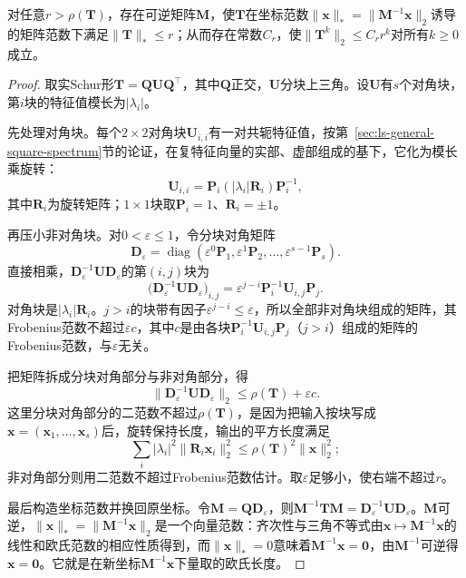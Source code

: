 \begin{lemma}[矩阵幂的几何上界]
\label{lem:ls-power-geometric-bound}
对任意$r>\rho(\bm T)$，存在可逆矩阵$\bm M$，使$\bm T$在坐标范数$\lVert\bm x\rVert_*=\lVert\bm M^{-1}\bm x\rVert_2$诱导的矩阵范数下满足$\lVert\bm T\rVert_*\leq r$；从而存在常数$C_r$，使$\lVert\bm T^k\rVert_2\leq C_rr^k$对所有$k\geq0$成立。
\end{lemma}
\begin{proof}
取实Schur形$\bm T=\bm Q\bm U\bm Q^\top$，其中$\bm Q$正交，$\bm U$分块上三角。设$\bm U$有$s$个对角块，第$i$块的特征值模长为$|\lambda_i|$。

先处理对角块。每个$2\times2$对角块$\bm U_{i,i}$有一对共轭特征值，按第~\ref{sec:ls-general-square-spectrum}节的论证，在复特征向量的实部、虚部组成的基下，它化为模长乘旋转：
\[
 \bm U_{i,i}=\bm P_i(|\lambda_i|\bm R_i)\bm P_i^{-1},
\]
其中$\bm R_i$为旋转矩阵；$1\times1$块取$\bm P_i=1$、$\bm R_i=\pm1$。

再压小非对角块。对$0<\varepsilon\leq1$，令分块对角矩阵
\[
 \bm D_\varepsilon=\operatorname{diag}(\varepsilon^{0}\bm P_1,\varepsilon^{1}\bm P_2,\ldots,\varepsilon^{s-1}\bm P_s).
\]
直接相乘，$\bm D_\varepsilon^{-1}\bm U\bm D_\varepsilon$的第$(i,j)$块为
\[
 \bigl(\bm D_\varepsilon^{-1}\bm U\bm D_\varepsilon\bigr)_{i,j}=\varepsilon^{j-i}\bm P_i^{-1}\bm U_{i,j}\bm P_j .
\]
对角块是$|\lambda_i|\bm R_i$。$j>i$的块带有因子$\varepsilon^{j-i}\leq\varepsilon$，所以全部非对角块组成的矩阵，其Frobenius范数不超过$\varepsilon c$，其中$c$是由各块$\bm P_i^{-1}\bm U_{i,j}\bm P_j$（$j>i$）组成的矩阵的Frobenius范数，与$\varepsilon$无关。

把矩阵拆成分块对角部分与非对角部分，得
\[
 \lVert\bm D_\varepsilon^{-1}\bm U\bm D_\varepsilon\rVert_2\leq\rho(\bm T)+\varepsilon c .
\]
这里分块对角部分的二范数不超过$\rho(\bm T)$，是因为把输入按块写成$\bm x=(\bm x_1,\ldots,\bm x_s)$后，旋转保持长度，输出的平方长度满足
\[
 \sum_i|\lambda_i|^2\lVert\bm R_i\bm x_i\rVert_2^2\leq\rho(\bm T)^2\lVert\bm x\rVert_2^2 ;
\]
非对角部分则用二范数不超过Frobenius范数估计。取$\varepsilon$足够小，使右端不超过$r$。

最后构造坐标范数并换回原坐标。令$\bm M=\bm Q\bm D_\varepsilon$，则$\bm M^{-1}\bm T\bm M=\bm D_\varepsilon^{-1}\bm U\bm D_\varepsilon$。$\bm M$可逆，$\lVert\bm x\rVert_*=\lVert\bm M^{-1}\bm x\rVert_2$是一个向量范数：齐次性与三角不等式由$\bm x\mapsto\bm M^{-1}\bm x$的线性和欧氏范数的相应性质得到，而$\lVert\bm x\rVert_*=0$意味着$\bm M^{-1}\bm x=\bm0$，由$\bm M^{-1}$可逆得$\bm x=\bm0$。它就是在新坐标$\bm M^{-1}\bm x$下量取的欧氏长度。


\end{proof}
